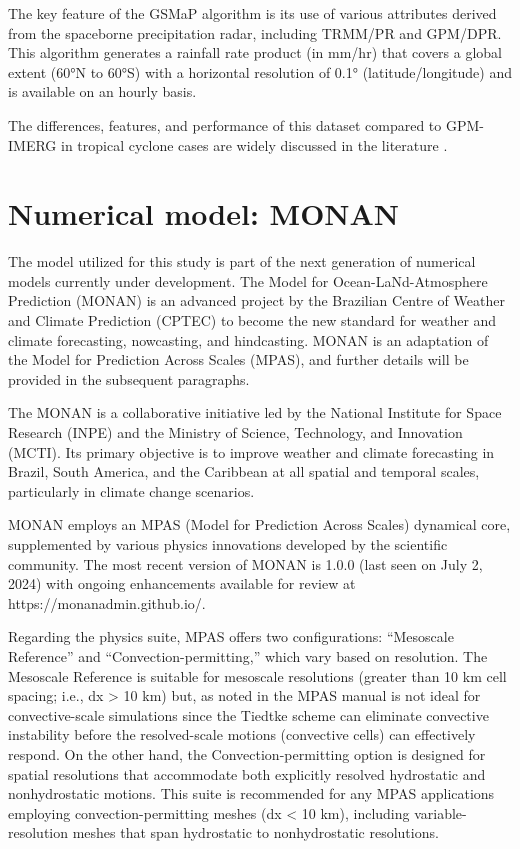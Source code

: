 The key feature of the GSMaP algorithm is its use of various attributes derived from the spaceborne precipitation radar, including TRMM/PR and GPM/DPR. This algorithm generates a rainfall rate product (in mm/hr) that covers a global extent (60°N to 60°S) with a horizontal resolution of 0.1° (latitude/longitude) and is available on an hourly basis.

The differences, features, and performance of this dataset compared to GPM-IMERG in tropical cyclone cases are widely discussed in the literature \cite{reddy2022accurately, bagtasa2022assessment, yang2024evaluation}.

\section{Numerical model: MONAN}

The model utilized for this study is part of the next generation of numerical models currently under development. The Model for Ocean-LaNd-Atmosphere Prediction (MONAN) is an advanced project by the Brazilian Centre of Weather and Climate Prediction (CPTEC) to become the new standard for weather and climate forecasting, nowcasting, and hindcasting. MONAN is an adaptation of the Model for Prediction Across Scales (MPAS), and further details will be provided in the subsequent paragraphs. 

The MONAN is a collaborative initiative led by the National Institute for Space Research (INPE) and the Ministry of Science, Technology, and Innovation (MCTI). Its primary objective is to improve weather and climate forecasting in Brazil, South America, and the Caribbean at all spatial and temporal scales, particularly in climate change scenarios.

MONAN employs an MPAS (Model for Prediction Across Scales) dynamical core, supplemented by various physics innovations developed by the scientific community. The most recent version of MONAN is 1.0.0 (last seen on July 2, 2024) with ongoing enhancements available for review at https://monanadmin.github.io/.

Regarding the physics suite, MPAS offers two configurations: “Mesoscale Reference” and “Convection-permitting,” which vary based on resolution. The Mesoscale Reference is suitable for mesoscale resolutions (greater than 10 km cell spacing; i.e., dx > 10 km) but, as noted in the MPAS manual %
is not ideal for convective-scale simulations since the Tiedtke scheme can eliminate convective instability before the resolved-scale motions (convective cells) can effectively respond. On the other hand, the Convection-permitting option is designed for spatial resolutions that accommodate both explicitly resolved hydrostatic and nonhydrostatic motions. This suite is recommended for any MPAS applications employing convection-permitting meshes (dx < 10 km), including variable-resolution meshes that span hydrostatic to nonhydrostatic resolutions.

